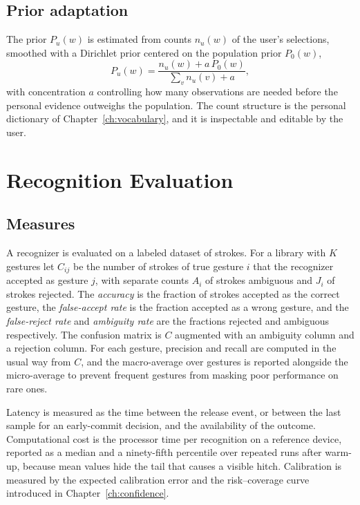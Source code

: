 \section{Prior adaptation}

The prior $P_u(w)$ is estimated from counts $n_u(w)$ of the user's selections, smoothed with a Dirichlet prior centered on the population prior $P_0(w)$,
\[
P_u(w)=\frac{n_u(w)+a\,P_0(w)}{\sum_{v}n_u(v)+a},
\]
with concentration $a$ controlling how many observations are needed before the personal evidence outweighs the population. The count structure is the personal dictionary of Chapter~\ref{ch:vocabulary}, and it is inspectable and editable by the user.

\chapter{Recognition Evaluation}\label{ch:recognition-evaluation}

\section{Measures}

A recognizer is evaluated on a labeled dataset of strokes. For a library with $K$ gestures let $C_{ij}$ be the number of strokes of true gesture $i$ that the recognizer accepted as gesture $j$, with separate counts $A_i$ of strokes ambiguous and $J_i$ of strokes rejected. The \emph{accuracy} is the fraction of strokes accepted as the correct gesture, the \emph{false-accept rate} is the fraction accepted as a wrong gesture, and the \emph{false-reject rate} and \emph{ambiguity rate} are the fractions rejected and ambiguous respectively. The confusion matrix is $C$ augmented with an ambiguity column and a rejection column. For each gesture, precision and recall are computed in the usual way from $C$, and the macro-average over gestures is reported alongside the micro-average to prevent frequent gestures from masking poor performance on rare ones.

Latency is measured as the time between the release event, or between the last sample for an early-commit decision, and the availability of the outcome. Computational cost is the processor time per recognition on a reference device, reported as a median and a ninety-fifth percentile over repeated runs after warm-up, because mean values hide the tail that causes a visible hitch. Calibration is measured by the expected calibration error and the risk--coverage curve introduced in Chapter~\ref{ch:confidence}.

